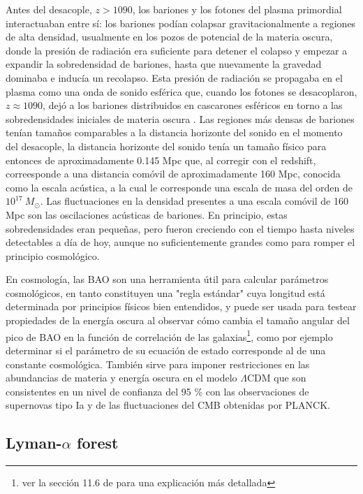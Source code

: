 \documentclass[final,5p,times,twocolumn, nopreprintline]{elsarticle}
\numberwithin{equation}{section}
\begin{document}
Antes del desacople, $z>1090$, los bariones y los fotones del plasma primordial interactuaban entre sí: los bariones podían colapsar gravitacionalmente a regiones de alta densidad, usualmente en los pozos de potencial de la materia oscura, donde la presión de radiación era suficiente para detener el colapso y empezar a expandir la sobredensidad de bariones, hasta que nuevamente la gravedad dominaba e inducía un recolapso. Esta presión de radiación se propagaba en el plasma como una onda de sonido esférica que, cuando los fotones se desacoplaron, $z\approx1090$, dejó a los bariones distribuidos en cascarones esféricos en torno a las sobredensidades iniciales de materia oscura \cite{graciela}. Las regiones más densas de bariones tenían tamaños comparables a la distancia horizonte del sonido en el momento del desacople, la distancia horizonte del sonido tenía un tamaño físico para entonces de aproximadamente 0.145 Mpc que, al corregir con el redshift, correesponde a una distancia comóvil de aproximadamente 160 Mpc, conocida como la escala acústica, a la cual le corresponde una escala de masa del orden de $10^{17}~M_\odot$. Las fluctuaciones en la densidad presentes a una escala comóvil de 160 Mpc son las oscilaciones acústicas de bariones. En principio, estas sobredensidades eran pequeñas, pero fueron creciendo con el tiempo hasta niveles detectables a día de hoy, aunque no suficientemente grandes como para romper el principio cosmológico.

En cosmología, las BAO son una herramienta útil para calcular parámetros cosmológicos, en tanto constituyen una "regla estándar" cuya longitud está determinada por principios físicos bien entendidos, y puede ser usada para testear propiedades de la energía oscura al observar cómo cambia el tamaño angular del pico de BAO en la función de correlación de las galaxias\footnote{ver la sección 11.6 de \cite{ryden2016introduction} para una explicación más detallada}, como por ejemplo determinar si el parámetro de su ecuación de estado corresponde al de una constante cosmológica. También sirve para imponer restricciones en las abundancias de materia y energía oscura en el modelo $\Lambda$CDM que son consistentes en un nivel de confianza del 95 \% con las observaciones de supernovas tipo Ia y de las fluctuaciones del CMB obtenidas por PLANCK.

\subsection{Lyman-$\alpha$ forest}

 











\end{document}
